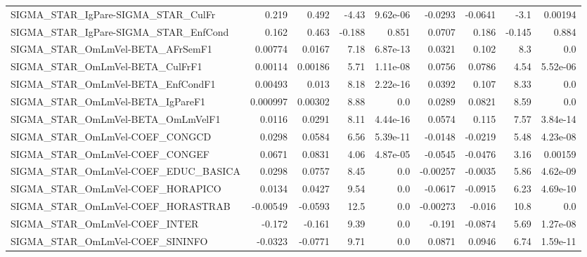 \begin{tabular}{lrrrrrrrr}
SIGMA\_STAR\_IgPare-SIGMA\_STAR\_CulFr    &       0.219 &        0.492 &   -4.43 & 9.62e-06 &    -0.0293 &     -0.0641 &         -3.1 &       0.00194 \\
SIGMA\_STAR\_IgPare-SIGMA\_STAR\_EnfCond  &       0.162 &        0.463 &  -0.188 &    0.851 &     0.0707 &       0.186 &       -0.145 &         0.884 \\
SIGMA\_STAR\_OmLmVel-BETA\_AFrSemF1      &     0.00774 &       0.0167 &    7.18 & 6.87e-13 &     0.0321 &       0.102 &          8.3 &           0.0 \\
SIGMA\_STAR\_OmLmVel-BETA\_CulFrF1       &     0.00114 &      0.00186 &    5.71 & 1.11e-08 &     0.0756 &      0.0786 &         4.54 &      5.52e-06 \\
SIGMA\_STAR\_OmLmVel-BETA\_EnfCondF1     &     0.00493 &        0.013 &    8.18 & 2.22e-16 &     0.0392 &       0.107 &         8.33 &           0.0 \\
SIGMA\_STAR\_OmLmVel-BETA\_IgPareF1      &    0.000997 &      0.00302 &    8.88 &      0.0 &     0.0289 &      0.0821 &         8.59 &           0.0 \\
SIGMA\_STAR\_OmLmVel-BETA\_OmLmVelF1     &      0.0116 &       0.0291 &    8.11 & 4.44e-16 &     0.0574 &       0.115 &         7.57 &      3.84e-14 \\
SIGMA\_STAR\_OmLmVel-COEF\_CONGCD        &      0.0298 &       0.0584 &    6.56 & 5.39e-11 &    -0.0148 &     -0.0219 &         5.48 &      4.23e-08 \\
SIGMA\_STAR\_OmLmVel-COEF\_CONGEF        &      0.0671 &       0.0831 &    4.06 & 4.87e-05 &    -0.0545 &     -0.0476 &         3.16 &       0.00159 \\
SIGMA\_STAR\_OmLmVel-COEF\_EDUC\_BASICA   &      0.0298 &       0.0757 &    8.45 &      0.0 &   -0.00257 &     -0.0035 &         5.86 &      4.62e-09 \\
SIGMA\_STAR\_OmLmVel-COEF\_HORAPICO      &      0.0134 &       0.0427 &    9.54 &      0.0 &    -0.0617 &     -0.0915 &         6.23 &      4.69e-10 \\
SIGMA\_STAR\_OmLmVel-COEF\_HORASTRAB     &    -0.00549 &      -0.0593 &    12.5 &      0.0 &   -0.00273 &      -0.016 &         10.8 &           0.0 \\
SIGMA\_STAR\_OmLmVel-COEF\_INTER         &      -0.172 &       -0.161 &    9.39 &      0.0 &     -0.191 &     -0.0874 &         5.69 &      1.27e-08 \\
SIGMA\_STAR\_OmLmVel-COEF\_SININFO       &     -0.0323 &      -0.0771 &    9.71 &      0.0 &     0.0871 &      0.0946 &         6.74 &      1.59e-11 \\

\end{tabular}
